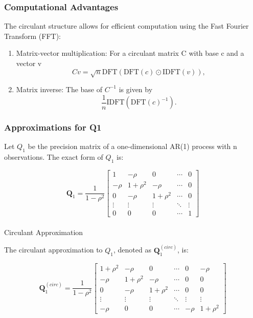 \documentclass[journal=,manuscript=]{achemso}
\makeatletter
\let\oldparagraph\paragraph
\renewcommand{\paragraph}{
    \@ifstar
      \xxxParagraphStar
      \xxxParagraphNoStar
  }
\newcommand{\xxxParagraphStar}[1]{\oldparagraph*{#1}\mbox{}}
\newcommand{\xxxParagraphNoStar}[1]{\oldparagraph{#1}\mbox{}}
\makeatother
\begin{document}
\subsubsection{Computational Advantages}\label{computational-advantages}

The circulant structure allows for efficient computation using the Fast
Fourier Transform (FFT):

\begin{enumerate}
\def\labelenumi{\arabic{enumi}.}
\item
  Matrix-vector multiplication: For a circulant matrix C with base c and
  a vector v \[
  Cv = \sqrt{n} \text{DFT}(\text{DFT}(c) \odot \text{IDFT}(v)),
  \]
\item
  Matrix inverse: The base of \(C^{-1}\) is given by \[
  \frac{1}{n} \text{IDFT}(\text{DFT}(c)^{-1}).
  \]
\end{enumerate}

\subsubsection{Approximations for Q1}\label{approximations-for-q1}

Let \(Q_1\) be the precision matrix of a one-dimensional AR(1) process
with n observations. The exact form of \(Q_1\) is:

\[
\mathbf{Q}_1 = \frac{1}{1-\rho^2}
\begin{bmatrix}
1 & -\rho & 0 & \cdots & 0 \\
-\rho & 1+\rho^2 & -\rho & \cdots & 0 \\
0 & -\rho & 1+\rho^2 & \cdots & 0 \\
\vdots & \vdots & \vdots & \ddots & \vdots \\
0 & 0 & 0 & \cdots & 1
\end{bmatrix}
\]

\paragraph{Circulant Approximation}\label{circulant-approximation}

The circulant approximation to \(Q_1\), denoted as
\(\mathbf{Q}_1^{(circ)}\), is:

\[
\mathbf{Q}_1^{(circ)} = \frac{1}{1-\rho^2}
\begin{bmatrix}
1+\rho^2 & -\rho & 0 & \cdots & 0 & -\rho \\
-\rho & 1+\rho^2 & -\rho & \cdots & 0 & 0 \\
0 & -\rho & 1+\rho^2 & \cdots & 0 & 0 \\
\vdots & \vdots & \vdots & \ddots & \vdots & \vdots \\
-\rho & 0 & 0 & \cdots & -\rho & 1+\rho^2
\end{bmatrix}
\]
\end{document}
